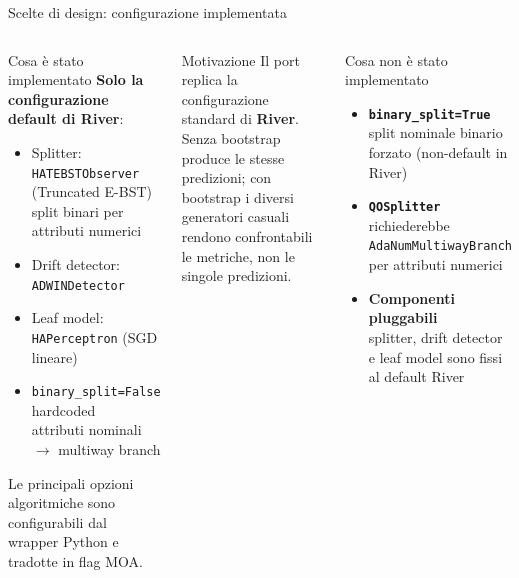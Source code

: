 \documentclass[aspectratio=169,10pt]{beamer}
\newcommand{\river}{\textcolor{riverblue}{\textbf{River}}}
\begin{document}
\begin{frame}[shrink=15]{Scelte di design: configurazione implementata}
  \begin{columns}[T]
    \begin{block}{Cosa è stato implementato}
      \small
      \textbf{Solo la configurazione default di River}:
      \begin{itemize}
        \item Splitter: \texttt{HATEBSTObserver} (Truncated E-BST)\\
              {\footnotesize split binari per attributi numerici}
        \item Drift detector: \texttt{ADWINDetector}
        \item Leaf model: \texttt{HAPerceptron} (SGD lineare)
        \item \texttt{binary\_split=False} hardcoded\\
              {\footnotesize attributi nominali $\to$ multiway branch}
      \end{itemize}
      \smallskip
      Le principali opzioni algoritmiche sono configurabili
      dal wrapper Python e tradotte in flag MOA.
    \end{block}

    \medskip
    \begin{block}{Motivazione}
      \small
      Il port replica la configurazione standard di \river{}.
      Senza bootstrap produce le stesse predizioni; con bootstrap
      i diversi generatori casuali rendono confrontabili le metriche,
      non le singole predizioni.
    \end{block}

    \begin{alertblock}{Cosa non è stato implementato}
      \small
      \begin{itemize}
        \item \textbf{\texttt{binary\_split=True}}\\
              {\footnotesize split nominale binario forzato
              (non-default in River)}
        \item \textbf{\texttt{QOSplitter}}\\
              {\footnotesize richiederebbe
              \texttt{AdaNumMultiwayBranch} per attributi numerici}
        \item \textbf{Componenti pluggabili}\\
              {\footnotesize splitter, drift detector e leaf model
              sono fissi al default River}
      \end{itemize}
    \end{alertblock}


\end{columns}
\end{frame}
\end{document}
